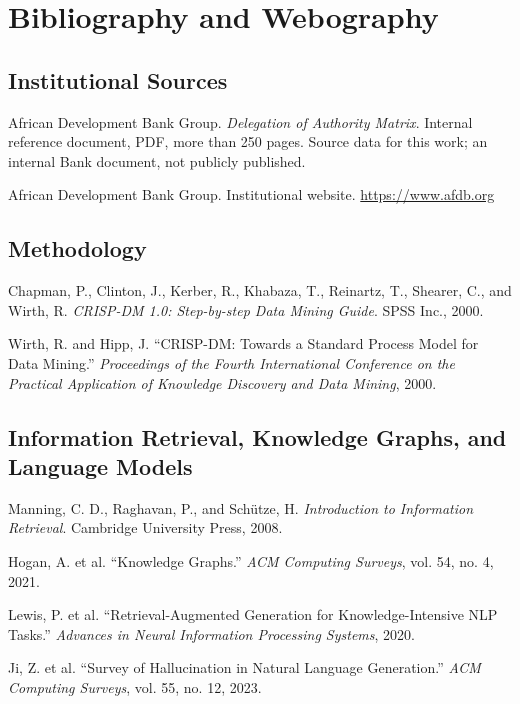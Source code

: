 \chapter*{Bibliography and Webography}

\section*{Institutional Sources}

\noindent [1] African Development Bank Group. \textit{Delegation of Authority Matrix}. Internal reference document, PDF, more than 250 pages. Source data for this work; an internal Bank document, not publicly published.

\noindent [2] African Development Bank Group. Institutional website. \url{https://www.afdb.org}

\section*{Methodology}

\noindent [3] Chapman, P., Clinton, J., Kerber, R., Khabaza, T., Reinartz, T., Shearer, C., and Wirth, R. \textit{CRISP-DM 1.0: Step-by-step Data Mining Guide}. SPSS Inc., 2000.

\noindent [4] Wirth, R. and Hipp, J. ``CRISP-DM: Towards a Standard Process Model for Data Mining.'' \textit{Proceedings of the Fourth International Conference on the Practical Application of Knowledge Discovery and Data Mining}, 2000.

\section*{Information Retrieval, Knowledge Graphs, and Language Models}

\noindent [5] Manning, C. D., Raghavan, P., and Sch\"utze, H. \textit{Introduction to Information Retrieval}. Cambridge University Press, 2008.

\noindent [6] Hogan, A. et al. ``Knowledge Graphs.'' \textit{ACM Computing Surveys}, vol. 54, no. 4, 2021.

\noindent [7] Lewis, P. et al. ``Retrieval-Augmented Generation for Knowledge-Intensive NLP Tasks.'' \textit{Advances in Neural Information Processing Systems}, 2020.

\noindent [8] Ji, Z. et al. ``Survey of Hallucination in Natural Language Generation.'' \textit{ACM Computing Surveys}, vol. 55, no. 12, 2023.

